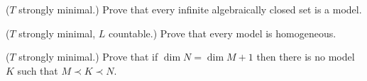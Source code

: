 \begin{exercise}\label{ex_infinite_acl}
  ($T$ strongly minimal.) Prove that every infinite algebraically closed set is a model.
\end{exercise}

\begin{exercise}\label{ex_sm_homogeneous}
  ($T$ strongly minimal, $L$ countable.) Prove that every model is homogeneous. 
\end{exercise}

\begin{exercise}
  ($T$ strongly minimal.) Prove that if $\dim N=\dim M+1$ then there is no model $K$ such that $M\prec K\prec N$. 
\end{exercise}




% 


